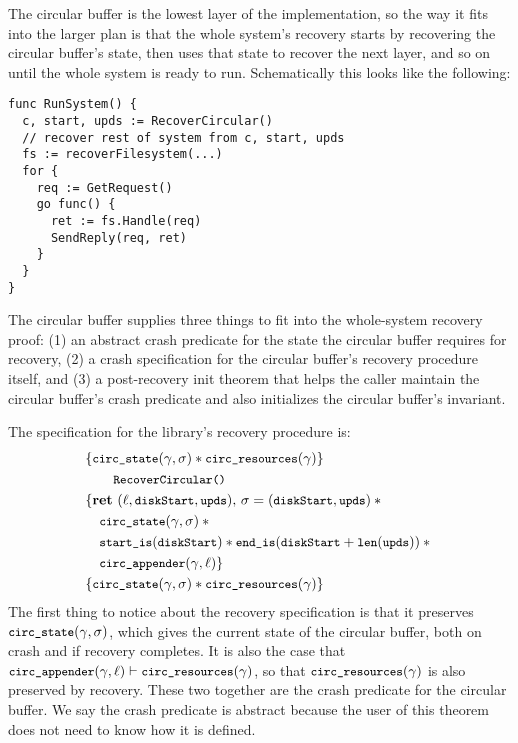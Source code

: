 The circular buffer is the lowest layer of the implementation, so the way it
fits into the larger plan is that the whole system's recovery starts by
recovering the circular buffer's state, then uses that state to recover the next
layer, and so on until the whole system is ready to run. Schematically this
looks like the following:
%
\begin{verbatim}
func RunSystem() {
  c, start, upds := RecoverCircular()
  // recover rest of system from c, start, upds
  fs := recoverFilesystem(...)
  for {
    req := GetRequest()
    go func() {
      ret := fs.Handle(req)
      SendReply(req, ret)
    }
  }
}
\end{verbatim}

The circular buffer supplies three things to fit into the whole-system
recovery proof: (1) an abstract crash predicate for the state the circular
buffer requires for recovery, (2) a crash specification for the circular
buffer's recovery procedure itself, and (3) a post-recovery init theorem that
helps the caller maintain the circular buffer's crash predicate and also
initializes the circular buffer's invariant.

The specification for the library's recovery procedure  is:
%
\begin{align*}
  &\{ \circstate(\gamma, \sigma) \sep \cc{circ_resources}(\gamma) \} \\
  &\qquad\cc{RecoverCircular()} \\
  &\{ \Ret{(\ell, \cc{diskStart}, \cc{upds})} \sigma = (\cc{diskStart}, \cc{upds}) \sep {} \\
  &\quad \circstate(\gamma, \sigma) \sep {}  \\
  &\quad \startIs(\cc{diskStart}) \sep \diskendIs(\cc{diskStart} + \cc{len}(\cc{upds})) \sep {} \\
  &\quad \cc{circ_appender}(\gamma, \ell) \} \\
  &\{ \circstate(\gamma, \sigma) \sep \cc{circ_resources}(\gamma) \}
\end{align*}
%
The first thing to notice about the recovery specification is that it preserves
$\circstate(\gamma, \sigma)$, which gives the current state of the circular
buffer, both on crash and if recovery completes. It is also the case that
$\cc{circ_appender}(\gamma, \ell) \proves \cc{circ_resources}(\gamma)$, so that
$\cc{circ_resources}(\gamma)$ is also preserved by recovery. These two together
are the crash predicate for the circular buffer. We say the crash predicate is
abstract because the user of this theorem does not need to know how it is
defined.

